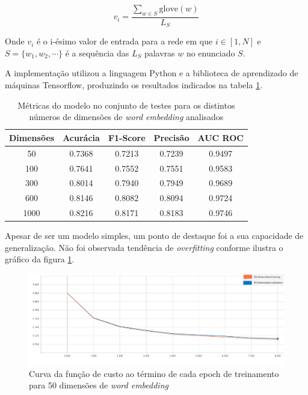 $$v_i = \dfrac {\sum_{w \in S} \text{glove}(w)} {L_S}$$

Onde $v_i$ é o i-ésimo valor de entrada para a rede em que $i \in [1,N]$ e $S = \{w_1, w_2, \cdots\}$ é a sequência das $L_S$ palavras $w$ no enunciado $S$.

A implementação utilizou a linguagem Python e a biblioteca de aprendizado de máquinas Tensorflow, produzindo os resultados indicados na tabela \ref{tab:simple_avg}.

\begin{table}[ht]
\centering
\caption{Métricas do modelo no conjunto de testes para os distintos números de dimensões de  \textit{word embedding} analisados}
\vspace{0.5cm}
\begin{tabular}{c|c|c|c|c}
 
Dimensões & Acurácia & F1-Score & Precisão & AUC ROC\\
\hline
50   & 0.7368 & 0.7213 & 0.7239 & 0.9497\\
100  & 0.7641 & 0.7552 & 0.7551 & 0.9583\\
300  & 0.8014 & 0.7940 & 0.7949 & 0.9689\\
600  & 0.8146 & 0.8082 & 0.8094 & 0.9724\\
1000 & 0.8216 & 0.8171 & 0.8183 & 0.9746
\end{tabular}
\label{tab:simple_avg}
\end{table}

Apesar de ser um modelo simples, um ponto de destaque foi a sua capacidade de generalização. Não foi observada tendência de \textit{overfitting} conforme ilustra o gráfico da figura \ref{fig:loss_50}.

\begin{figure}[!ht]
	\centering
	\includegraphics[width=1.1\textwidth]{figures/loss-50.PNG}
	\caption{Curva da função de custo ao término de cada epoch de treinamento para 50 dimensões de \textit{word embedding}}
	\label{fig:loss_50}
\end{figure}

